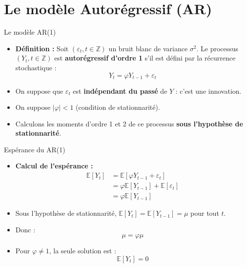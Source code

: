 \documentclass[11pt,aspectratio=169]{beamer}
\newcommand{\E}{\mathbb{E}}
\newcommand{\Z}{\mathbb{Z}}
\begin{document}
\section{Le modèle Autorégressif (AR)}

\begin{frame}{Le modèle AR(1)}

\begin{itemize}

\item \textbf{Définition :} Soit $(\varepsilon_t, t \in \Z)$ un bruit blanc de variance $\sigma^2$. Le processus $(Y_t, t \in \Z)$ est \textbf{autorégressif d'ordre 1} s'il est défini par la récurrence stochastique :
\[
Y_t = \varphi Y_{t-1} + \varepsilon_t
\]

\item On suppose que $\varepsilon_t$ est \textbf{indépendant du passé} de $Y$ : c'est une innovation.\newline

\item On suppose $|\varphi| < 1$ (condition de stationnarité).\newline

\item Calculons les moments d'ordre 1 et 2 de ce processus \textbf{sous l'hypothèse de stationnarité}.

\end{itemize}
\end{frame}

\begin{frame}{Espérance du AR(1)}

\begin{itemize}

\item \textbf{Calcul de l'espérance :}
\begin{align*}
\E[Y_t] &= \E[\varphi Y_{t-1} + \varepsilon_t] \\
&= \varphi \E[Y_{t-1}] + \E[\varepsilon_t] \\
&= \varphi \E[Y_{t-1}]
\end{align*}

\item Sous l'hypothèse de stationnarité, $\E[Y_t] = \E[Y_{t-1}] = \mu$ pour tout $t$.\newline

\item Donc :
\[
\mu = \varphi \mu
\]

\item Pour $\varphi \neq 1$, la seule solution est :
\[
\boxed{\E[Y_t] = 0}
\]

\end{itemize}
\end{frame}
\end{document}
